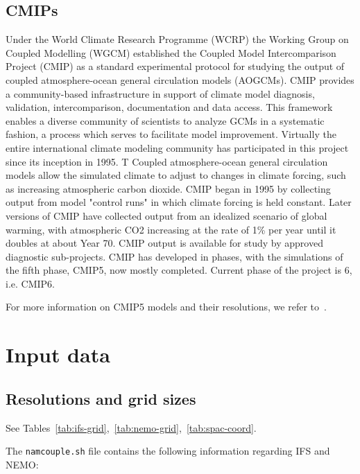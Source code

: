 \subsection{CMIPs}
Under the World Climate Research Programme (WCRP) the Working Group on Coupled Modelling (WGCM) established the Coupled Model Intercomparison Project (CMIP) as a standard experimental protocol for studying the output of coupled atmosphere-ocean general circulation models (AOGCMs). CMIP provides a community-based infrastructure in support of climate model diagnosis, validation, intercomparison, documentation and data access. This framework enables a diverse community of scientists to analyze GCMs in a systematic fashion, a process which serves to facilitate model improvement. Virtually the entire international climate modeling community has participated in this project since its inception in 1995. T
Coupled atmosphere-ocean general circulation models allow the simulated climate to adjust to changes in climate forcing, such as increasing atmospheric carbon dioxide. CMIP began in 1995 by collecting output from model "control runs" in which climate forcing is held constant. Later versions of CMIP have collected output from an idealized scenario of global warming, with atmospheric CO2 increasing at the rate of 1\% per year until it doubles at about Year 70. CMIP output is available for study by approved diagnostic sub-projects. 
CMIP has developed in phases, with the simulations of the fifth phase, CMIP5, now mostly completed. Current phase of the project is 6, i.e. CMIP6. 

For more information on CMIP5 models and their resolutions, we refer to~\cite{cmip5}.

\section{Input data}

\subsection{Resolutions and grid sizes}
See Tables~\ref{tab:ifs-grid},~\ref{tab:nemo-grid},~\ref{tab:spac-coord}.


The \texttt{namcouple.sh} file contains the following information regarding IFS and NEMO:

